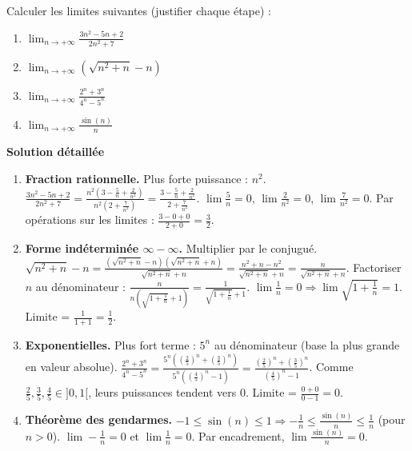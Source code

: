 \documentclass[11pt]{article}
\begin{document}
\begin{exoresolu}
    Calculer les limites suivantes (justifier chaque étape) :
    \begin{enumerate}
        \item $\displaystyle \lim_{n\to+\infty} \frac{3n^2 - 5n + 2}{2n^2 + 7}$
        \item $\displaystyle \lim_{n\to+\infty} \left( \sqrt{n^2+n} - n \right)$
        \item $\displaystyle \lim_{n\to+\infty} \frac{2^n + 3^n}{4^n - 5^n}$
        \item $\displaystyle \lim_{n\to+\infty} \frac{\sin(n)}{n}$
    \end{enumerate}
    \tcblower
    \textbf{Solution détaillée}
    \begin{enumerate}
        \item \textbf{Fraction rationnelle.} Plus forte puissance : $n^2$.
        $\frac{3n^2 - 5n + 2}{2n^2 + 7} = \frac{n^2(3 - \frac{5}{n} + \frac{2}{n^2})}{n^2(2 + \frac{7}{n^2})} = \frac{3 - \frac{5}{n} + \frac{2}{n^2}}{2 + \frac{7}{n^2}}$.
        $\lim \frac{5}{n} = 0$, $\lim \frac{2}{n^2}=0$, $\lim \frac{7}{n^2}=0$.
        Par opérations sur les limites : $\frac{3 - 0 + 0}{2 + 0} = \frac{3}{2}$.
        \item \textbf{Forme indéterminée $\infty - \infty$.} Multiplier par le conjugué.
        $\sqrt{n^2+n} - n = \frac{(\sqrt{n^2+n} - n)(\sqrt{n^2+n} + n)}{\sqrt{n^2+n} + n} = \frac{n^2+n - n^2}{\sqrt{n^2+n} + n} = \frac{n}{\sqrt{n^2+n} + n}$.
        Factoriser $n$ au dénominateur : $\frac{n}{n(\sqrt{1+\frac{1}{n}} + 1)} = \frac{1}{\sqrt{1+\frac{1}{n}} + 1}$.
        $\lim \frac{1}{n} = 0 \Rightarrow \lim \sqrt{1+\frac{1}{n}} = 1$.
        Limite = $\frac{1}{1+1} = \frac{1}{2}$.
        \item \textbf{Exponentielles.} Plus fort terme : $5^n$ au dénominateur (base la plus grande en valeur absolue).
        $\frac{2^n + 3^n}{4^n - 5^n} = \frac{5^n\left( (\frac{2}{5})^n + (\frac{3}{5})^n \right)}{5^n\left( (\frac{4}{5})^n - 1 \right)} = \frac{ (\frac{2}{5})^n + (\frac{3}{5})^n }{ (\frac{4}{5})^n - 1 }$.
        Comme $\frac{2}{5}, \frac{3}{5}, \frac{4}{5} \in ]0,1[$, leurs puissances tendent vers 0.
        Limite = $\frac{0+0}{0-1} = 0$.
        \item \textbf{Théorème des gendarmes.} $-1 \le \sin(n) \le 1 \Rightarrow -\frac{1}{n} \le \frac{\sin(n)}{n} \le \frac{1}{n}$ (pour $n>0$).
        $\lim -\frac{1}{n} = 0$ et $\lim \frac{1}{n} = 0$.
        Par encadrement, $\lim \frac{\sin(n)}{n} = 0$.
    \end{enumerate}
\end{exoresolu}
\end{document}
